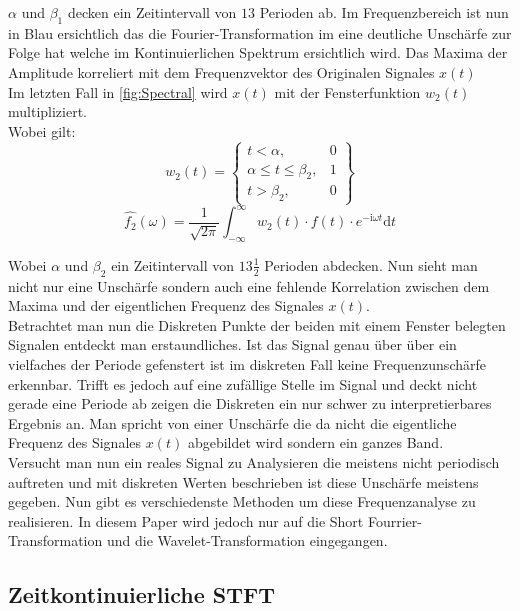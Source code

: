 $\alpha$ und $\beta_{1}$ decken ein Zeitintervall von $13$ Perioden ab. Im Frequenzbereich ist nun in Blau ersichtlich das die Fourier-Transformation im eine deutliche Unschärfe zur Folge hat welche im Kontinuierlichen Spektrum ersichtlich wird. Das Maxima der Amplitude korreliert mit dem Frequenzvektor des Originalen Signales $x(t)$\\




Im letzten Fall in \ref{fig:Spectral} wird $x(t)$ mit der Fensterfunktion $w_{2}(t)$ multipliziert.\\
Wobei gilt: 
\begin{equation}
	w_{2}(t)= \left\{\begin{array}{lll}{t<\alpha,} & {0} \\ {\alpha\leq t \leq\beta_{2},} & {1}\\ {t>\beta_{2},}&{0}\end{array}\right\}
\end{equation}
\begin{equation}
	\hat{f_{2}}(\omega)=\frac{1}{\sqrt{2 \pi}} \int_{-\infty}^{\infty} w_{2}(t)\cdot f(t) \cdot e^{-\mathrm{i} \omega t} \mathrm{d} t
\end{equation}

Wobei $\alpha$ und $\beta_{2}$ ein Zeitintervall von $13\frac{1}{2}$ Perioden abdecken. Nun sieht man nicht nur eine Unschärfe sondern auch eine fehlende Korrelation zwischen dem Maxima und der eigentlichen Frequenz des Signales $x(t)$.\\
Betrachtet man nun die Diskreten Punkte der beiden mit einem Fenster belegten Signalen entdeckt man erstaundliches. Ist das Signal genau über über ein vielfaches der Periode gefenstert ist im diskreten Fall keine Frequenzunschärfe erkennbar. Trifft es jedoch auf eine zufällige Stelle im Signal und deckt nicht gerade eine Periode ab zeigen die Diskreten ein nur schwer zu interpretierbares Ergebnis an. Man spricht von einer Unschärfe die da nicht die eigentliche Frequenz des Signales $x(t)$ abgebildet wird sondern ein ganzes Band.\\
Versucht man nun ein reales Signal zu Analysieren die meistens nicht periodisch auftreten und mit diskreten Werten beschrieben ist diese Unschärfe meistens gegeben. Nun gibt es verschiedenste Methoden um diese Frequenzanalyse zu realisieren. In diesem Paper wird jedoch nur auf die Short Fourrier-Transformation und die Wavelet-Transformation eingegangen. 


\subsection{Zeitkontinuierliche STFT}

